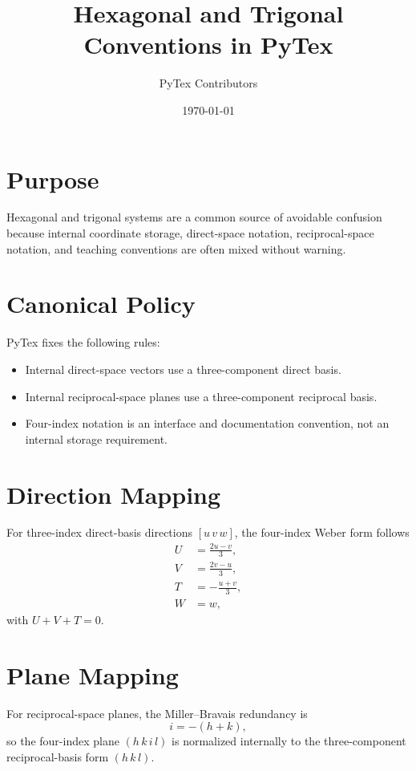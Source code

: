 \documentclass[11pt]{article}
\title{Hexagonal and Trigonal Conventions in PyTex}
\author{PyTex Contributors}
\date{\today}
\begin{document}
\maketitle

\section{Purpose}

Hexagonal and trigonal systems are a common source of avoidable confusion because internal coordinate storage, direct-space notation, reciprocal-space notation, and teaching conventions are often mixed without warning.

\section{Canonical Policy}

PyTex fixes the following rules:

\begin{itemize}
  \item Internal direct-space vectors use a three-component direct basis.
  \item Internal reciprocal-space planes use a three-component reciprocal basis.
  \item Four-index notation is an interface and documentation convention, not an internal storage requirement.
\end{itemize}

\section{Direction Mapping}

For three-index direct-basis directions $[u\,v\,w]$, the four-index Weber form follows
\begin{align*}
  U &= \frac{2u - v}{3}, \\
  V &= \frac{2v - u}{3}, \\
  T &= -\frac{u + v}{3}, \\
  W &= w,
\end{align*}
with $U + V + T = 0$.

\section{Plane Mapping}

For reciprocal-space planes, the Miller--Bravais redundancy is
\[
  i = -(h + k),
\]
so the four-index plane $(h\,k\,i\,l)$ is normalized internally to the three-component reciprocal-basis form $(h\,k\,l)$.
\end{document}
